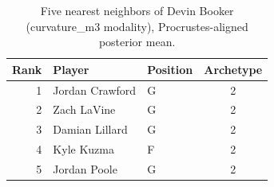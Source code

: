 \begin{table}[htbp]
  \centering\small
  \begin{tabular}{rllc}
    \toprule
    Rank & Player & Position & Archetype \\
    \midrule
    1 & Jordan Crawford & G & 2 \\
    2 & Zach LaVine & G & 2 \\
    3 & Damian Lillard & G & 2 \\
    4 & Kyle Kuzma & F & 2 \\
    5 & Jordan Poole & G & 2 \\
    \bottomrule
  \end{tabular}
  \caption{Five nearest neighbors of Devin Booker (curvature_m3 modality), Procrustes-aligned posterior mean.}
  \label{tab:Devin_Booker_neighbors_curvature_m3}
\end{table}

